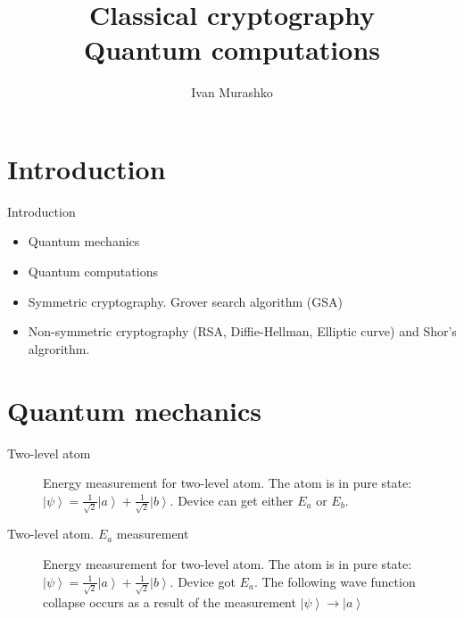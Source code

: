 \documentclass[10pt,pdf,hyperref={unicode}]{beamer}
\title[Cryptography and quantum computations]{Classical
  cryptography\\Quantum computations}
\author{Ivan Murashko}
\date{}
\begin{document}
\begin{frame}
\titlepage
\end{frame}


\section{Introduction}

\begin{frame}{Introduction}
\begin{itemize}
\item Quantum mechanics
\item Quantum computations
\item Symmetric cryptography. Grover search algorithm (GSA)
\item Non-symmetric cryptography (RSA, Diffie-Hellman, Elliptic
curve) and Shor's algrorithm.
\end{itemize}
\end{frame}

\section{Quantum mechanics}
\begin{frame}{Two-level atom}
\begin{figure}
\centering



\caption{Energy measurement for two-level atom. The atom is in pure
  state:  $\left|\psi\right> = 
  \frac{1}{\sqrt{2}}\left|a\right> + \frac{1}{\sqrt{2}}\left|b\right>$.
  Device can get either $E_a$ or $E_b$.
}
\label{fig:add:mesure_ex}
\end{figure}
\end{frame}

\begin{frame}{Two-level atom. $E_a$ measurement}
\begin{figure}
\centering



\caption{Energy measurement for two-level atom. The atom is in pure
  state: $\left|\psi\right> = 
  \frac{1}{\sqrt{2}}\left|a\right> + \frac{1}{\sqrt{2}}\left|b\right>$.
  Device got $E_a$. The following wave function collapse occurs as a
  result of the measurement $\left|\psi\right> \to \left|a\right>$
}
\label{fig:add:mesure_ex_a}
\end{figure}
\end{frame}
\end{document}
